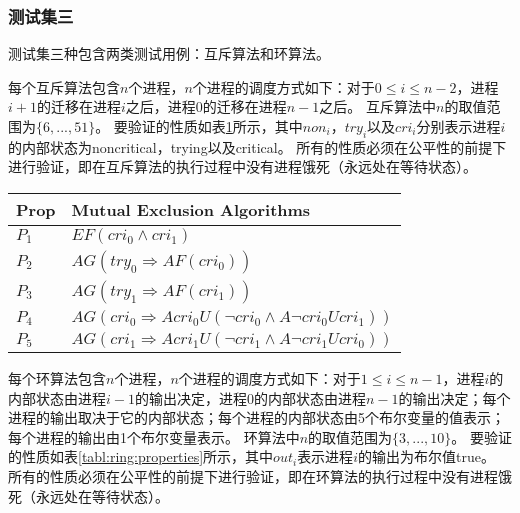 

\subsubsection{测试集三}
测试集三种包含两类测试用例：互斥算法和环算法。

每个互斥算法包含$n$个进程，$n$个进程的调度方式如下：对于$0\le i\le n-2$，进程$i+1$的迁移在进程$i$之后，进程$0$的迁移在进程$n-1$之后。
互斥算法中$n$的取值范围为$\{6,...,51\}$。
要验证的性质如表\ref{tabl:mutual:properties}所示，其中$non_i$，$try_i$以及$cri_i$分别表示进程$i$的内部状态为\textsf{noncritical}，\textsf{trying}以及\textsf{critical}。
所有的性质必须在公平性的前提下进行验证，即在互斥算法的执行过程中没有进程饿死（永远处在等待状态）。

\begin{table}[h!]
	\small
	\begin{center}
		\begin{tabular}{| l | l |}
			\hline
			\textbf{Prop} & \textbf{Mutual Exclusion Algorithms}\\
			\hline
			{$P_1$} & $EF (cri_0 \wedge cri_1)$  \\
			\hline
			{$P_2$} &  $AG (try_0 \Rightarrow AF (cri_0))$\\
			\hline
			{$P_3$} &  $AG (try_1 \Rightarrow AF (cri_1))$\\
			
			\hline
			{$P_4$} &  $AG (cri_0 \Rightarrow A cri_0 U (\neg cri_0 \wedge A \neg cri_0 U cri_1))$  \\
			\hline
			{$P_5$} &  $AG (cri_1 \Rightarrow A cri_1 U (\neg cri_1 \wedge A \neg cri_1 U cri_0))$\\
			\hline
		\end{tabular}
	\end{center}
	\label{tabl:mutual:properties}
\end{table}

每个环算法包含$n$个进程，$n$个进程的调度方式如下：对于$1\le i\le n-1$，进程$i$的内部状态由进程$i-1$的输出决定，进程$0$的内部状态由进程$n-1$的输出决定；每个进程的输出取决于它的内部状态；每个进程的内部状态由5个布尔变量的值表示；每个进程的输出由1个布尔变量表示。
环算法中$n$的取值范围为$\{3,...,10\}$。
要验证的性质如表\ref{tabl:ring:properties}所示，其中$out_i$表示进程$i$的输出为布尔值\textsf{true}。
所有的性质必须在公平性的前提下进行验证，即在环算法的执行过程中没有进程饿死（永远处在等待状态）。

